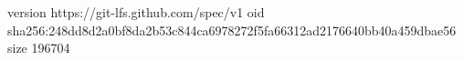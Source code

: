 version https://git-lfs.github.com/spec/v1
oid sha256:248dd8d2a0bf8da2b53c844ca6978272f5fa66312ad2176640bb40a459dbae56
size 196704

